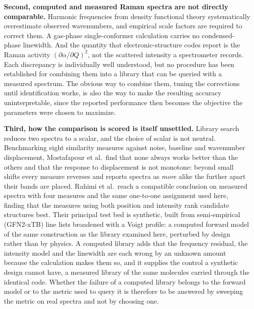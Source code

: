 \documentclass[review,12pt]{elsarticle}
\begin{document}
\textbf{Second, computed and measured Raman spectra are not directly comparable.} Harmonic frequencies from density functional theory systematically overestimate observed wavenumbers, and empirical scale factors are required to correct them.\cite{scott1996harmonic,rauhut1995transferable,halls2001harmonic,andersson2005newscale,merrick2007evaluation,alecu2010computational} A gas-phase single-conformer calculation carries no condensed-phase linewidth. And the quantity that electronic-structure codes report is the Raman activity $(\partial\alpha/\partial Q)^2$, not the scattered intensity a spectrometer records.\cite{komornicki1979efficient} Each discrepancy is individually well understood, but no procedure has been established for combining them into a library that can be queried with a measured spectrum. The obvious way to combine them, tuning the corrections until identification works, is also the way to make the resulting accuracy uninterpretable, since the reported performance then becomes the objective the parameters were chosen to maximize.

\textbf{Third, how the comparison is scored is itself unsettled.} Library search reduces two spectra to a scalar, and the choice of scalar is not neutral. Benchmarking eight similarity measures against noise, baseline and wavenumber displacement, Mostafapour et al.\ find that none always works better than the others and that the response to displacement is not monotone: beyond small shifts every measure reverses and reports spectra as \emph{more} alike the further apart their bands are placed.\cite{mostafapour2026raman} Rahimi et al.\ reach a compatible conclusion on measured spectra with four measures and the same one-to-one assignment used here, finding that the measures using both position and intensity rank candidate structures best.\cite{rahimi2026spectral} Their principal test bed is synthetic, built from semi-empirical (GFN2-xTB) line lists broadened with a Voigt profile: a computed forward model of the same construction as the library examined here, perturbed by design rather than by physics. A computed library adds that the frequency residual, the intensity model and the linewidth are each wrong by an unknown amount because the calculation makes them so, and it supplies the control a synthetic design cannot have, a measured library of the same molecules carried through the identical code. Whether the failure of a computed library belongs to the forward model or to the metric used to query it is therefore to be answered by sweeping the metric on real spectra and not by choosing one.
\end{document}
